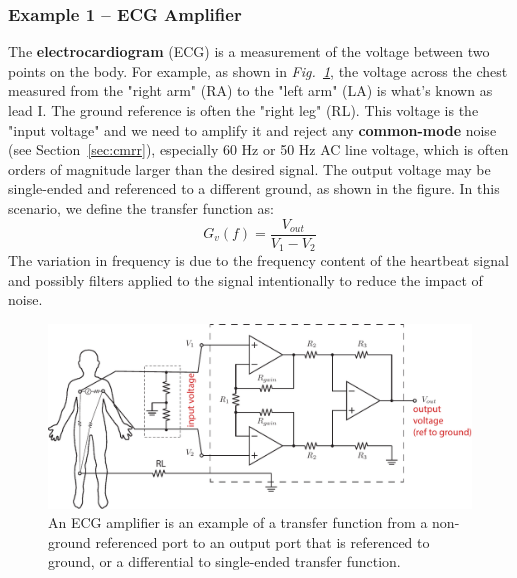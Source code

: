 \subsubsection{Example 1 – ECG Amplifier}
The \textbf{electrocardiogram} (ECG) is a measurement of the voltage between two points on the body.  For example, as shown in \emph{Fig.~\ref{fig:ecg}}, the voltage across the chest measured from the "right arm" (RA) to the "left arm" (LA) is what's known as lead I.  The ground reference is often the "right leg" (RL).  This voltage is the "input voltage" and we need to amplify it and reject any \textbf{common-mode} noise (see Section~\ref{sec:cmrr}), especially 60 Hz or 50 Hz AC line voltage, which is often orders of magnitude larger than the desired signal.  The output voltage may be single-ended and referenced to a different ground, as shown in the figure.  In this scenario, we define the transfer function as:
    \begin{equation}
        G_v(f) = \frac{V_{out}}{V_1 - V_2 }
    \end{equation}
The variation in frequency is due to the frequency content of the heartbeat signal and possibly filters applied to the signal intentionally to reduce the impact of noise.
\begin{figure}[tb]
\centering
\includegraphics[width=.95\columnwidth]{ex_opamp-ia2}
\caption{An ECG amplifier is an example of a transfer function from a non-ground referenced port to an output port that is referenced to ground, or a differential to single-ended transfer function.}
\label{fig:ecg}
\end{figure}
